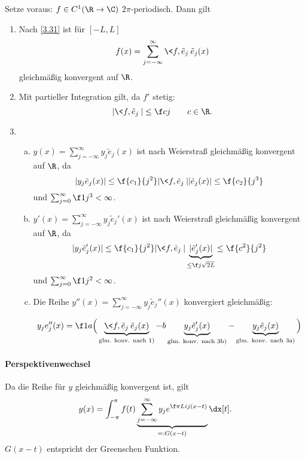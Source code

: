 \begin{ex}
	Setze voraus: $f \in C^1(\R \to \C)$ $2\pi$-periodisch.
	Dann gilt
	\begin{enumerate}[1)]
		\item
			Nach \ref{3.31} ist für $[-L,L]$
			\[
				f(x) = \sum_{j=-\infty}^\infty \<f,\tilde e_j\> \tilde e_j(x)
			\]
			gleichmäßig konvergent auf $\R$.
		\item
			Mit partieller Integration gilt, da $f'$ stetig:
			\[
				|\<f, \tilde e_j\>|
				\le \f c j \qquad c \in \R.
			\]
		\item
			\begin{enumerate}[a)]
				\item
					$y(x) = \sum_{j=-\infty}^\infty y_j \tilde e_j(x)$ ist nach Weierstraß gleichmäßig konvergent auf $\R$, da
					\[
						|y_j \tilde e_j(x)| \le \f {c_1}{j^2} |\<f, \tilde e_j\>| |\tilde e_j(x)| \le \f {c_2}{j^3}
					\]
					 und $\sum_{j=0}^\infty \f 1{j^3} < \infty$.
				\item
					$y'(x) = \sum_{j=-\infty}^\infty y_j \tilde e_j'(x)$ ist nach Weierstraß gleichmäßig konvergent auf $\R$, da
					\begin{align*}
						|y_j \tilde e_j'(x)| \le \f {c_1}{j^2} |\<f,\tilde e_j\>| \underbrace{|\tilde e_j'(x)|}_{\le \f j {\sqrt{2L}}} \le \f {c^2}{j^2}
					\end{align*}
					und $\sum_{j=0}^\infty \f 1{j^2} < \infty$.
				\item
					Die Reihe $y''(x) = \sum_{j=-\infty}^\infty y_j \tilde e_j''(x)$ konvergiert gleichmäßig:

					\begin{align*}
						y_j e_j''(x)
						= \f 1{a} \Big(\underbrace{\<f, \tilde e_j\> \tilde e_j(x)}_{\text{glm. konv. nach 1)}} - b\underbrace{y_j \tilde e_j'(x)}_{\text{glm. konv. nach 3b)}} - \underbrace{y_j \tilde e_j(x)}_{\text{glm. konv. nach 3a)}} \Big)
					\end{align*}
			\end{enumerate}
	\end{enumerate}

	\paragraph{Perspektivenwechsel}

	Da die Reihe für $y$ gleichmäßig konvergent ist, gilt
	\begin{align*}
		y(x) = \int_{-\pi}^\pi f(t) \underbrace{\sum_{j=-\infty}^\infty y_j e^{\f \pi L ij(x-t)}}_{=:G(x-t)} \dx[t].
	\end{align*}
	$G(x-t)$ entspricht der Greenschen Funktion.
\end{ex}

